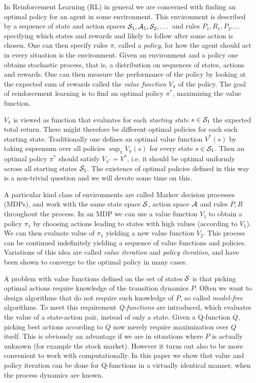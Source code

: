 
In Reinforcement Learning (RL) in general
we are concerned with finding an optimal policy
for an agent in some environment.
This environment is described by
a sequence of state and action spaces
$\mathcal{S}_1, \mathcal{A}_1, \mathcal{S}_2, \dots$
and rules $P_1, R_1, P_2, \dots$ specifying which states and rewards
and likely to follow after some action is chosen.
One can then specify rules $\pi$, called a \emph{policy},
for how the agent should act in every situation is the environment.
Given an environment and a policy one obtains stochastic process,
that is, a distribution on sequences of states, actions and
rewards.
One can then measure the performance of the policy by looking at
the expected sum of rewards called the \emph{value function}
$V_\pi$ of the policy.
The goal of reinforcement learning is to find an optimal policy $\pi^*$,
maximizing the value function.

$V_\pi$ is viewed as function that evaluates for each \emph{starting state}
$s \in \mathcal{S}_1$ the expected total return.
There might therefore be different optimal policies for each such starting
state.
Traditionally one defines an optimal value function $V^*(s)$
by taking supremum over all policies $\sup_\pi V_\pi(s)$ for every state
$s \in \mathcal{S}_1$.
Then an optimal policy $\pi^*$ should satisfy $V_{\pi^*} = V^*$,
i.e. it should be optimal uniformly across all starting states $\mathcal{S}_1$.
The existence of optimal policies defined in this way is a non-trivial
question and we will devote some time on this.

A particular kind class of environments are called Markov decision processes
(MDPs),
and work with the same state space $\mathcal{S}$, action space $\mathcal{A}$ and rules
$P, R$ throughout the process.
In an MDP we can use a value function $V_1$ to obtain a policy $\pi_1$
by choosing actions
leading to states with high values (according to $V_1$).
We can then evaluate value of $\pi_1$ yielding a new value function $V_2$.
This process can be continued indefinitely yielding a sequence of value
functions and policies.
Variations of this idea are called \emph{value iteration} and
\emph{policy iteration}, and have been shown to converge to the optimal
policy in many cases.

A problem with value functions defined on the set of states $\mathcal{S}$ is that
picking optimal actions require knowledge of the transition dynamics $P$.
Often we want to design algorithms that do not require such knowledge of $P$,
so called \emph{model-free} algorithms.
To meet this requirement \emph{Q-functions} are introduced, which evaluates
the value of a state-action pair, instead of only a state.
Given a Q-function $Q$, picking best actions according to $Q$ now
merely require maximization over $Q$ itself.
This is obviously an advantage if we are in situations where $P$ is actually
unknown (for example the stock market).
However it turns out also to be more convenient to work with computationally.
In this paper we show that value and policy iteration can be done
for Q-functions in a virtually identical manner, when the process dynamics
are known.

